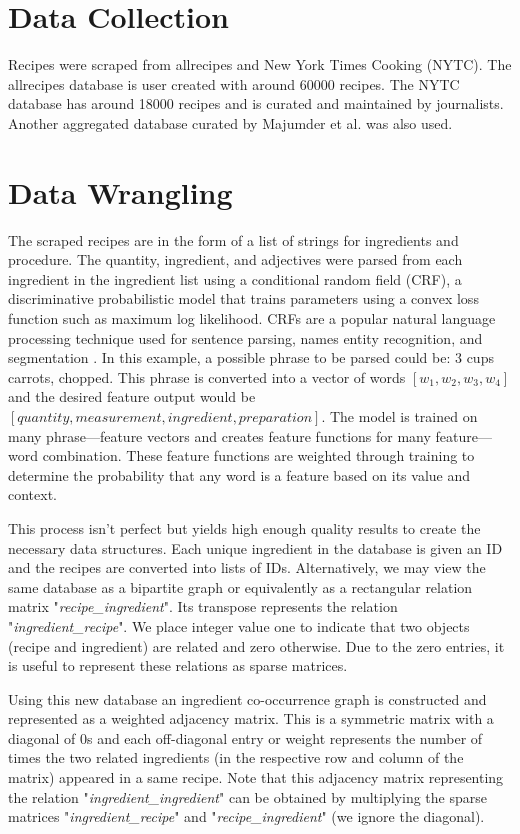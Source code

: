 \documentclass[conference]{IEEEtran}
\begin{document}
\section{Data Collection}
Recipes were scraped from allrecipes and New York Times Cooking (NYTC). The allrecipes database is
user created with around 60000 recipes. The NYTC database has around 18000 recipes and is
curated and maintained by journalists. Another aggregated database curated by Majumder et al.
\cite{Majumder19} was also used.

\section{Data Wrangling}
The scraped recipes are in the form of a list of strings for ingredients and procedure.
The quantity, ingredient, and adjectives were parsed from each ingredient in the ingredient
list using a conditional random field (CRF),
a discriminative probabilistic model that trains parameters using a convex loss function such
as maximum log likelihood. CRFs are a popular natural language processing
technique used for sentence parsing, names entity recognition, and segmentation \cite{Lafferty01}.
In this example, a possible phrase to be parsed could be: 3 cups carrots, chopped. This phrase is
converted into a vector of words $[w_1,w_2,w_3,w_4]$ and the desired feature output would be $[quantity, measurement, ingredient, preparation]$.
The model is trained on many phrase---feature vectors and creates feature functions for many feature---word combination.
These feature functions are weighted through training to determine the probability that any word is a feature based on its value and context.

This process isn't perfect but yields high enough quality results to create the necessary
data structures. Each unique ingredient in the database is given an ID and the recipes are
converted into lists of IDs. Alternatively, we may view the same database as a bipartite graph or equivalently as a rectangular relation  matrix "{\em recipe\_ingredient}".
Its transpose represents the relation "{\em ingredient\_recipe}". We place integer value one to indicate that two objects (recipe and ingredient) are related and zero otherwise.
Due to the zero entries, it is useful to represent these relations as sparse matrices. 

Using this new database an ingredient co-occurrence graph is constructed and represented as a weighted 
adjacency matrix. This is a symmetric matrix with a diagonal of 0s and each off-diagonal 
entry or weight  represents the number of times the two related ingredients (in the respective row and column of the matrix)  appeared in a same recipe.
Note that this adjacency matrix representing the relation "{\em ingredient\_ingredient}" can be obtained by multiplying the sparse matrices 
 "{\em ingredient\_recipe}" and "{\em recipe\_ingredient}" (we ignore the diagonal). 
\end{document}
